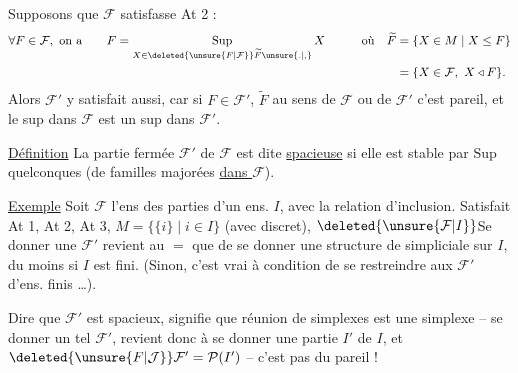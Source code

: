 Supposons que $\mathcal F$ satisfasse At 2 :
\[
\begin{aligned}
\forall F\in\mathcal F,\ \text{on a}\qquad
 F&=\mathop{\mathrm{Sup}}\limits_{X\in\deleted{\unsure{F|\mathcal F}}\widetilde F\unsure{.|,}}X
 &\qquad \text{où}\quad \widetilde F&=\{X\in M\mid X\leq F\}\\
 &&&=\{X\in\mathcal F,\ X\triangleleft F\}.
\end{aligned}
\]
Alors $\mathcal F'$ y satisfait aussi, car si $F\in\mathcal F'$, $\widetilde F$ au sens de $\mathcal F$ ou de $\mathcal F'$ c'est pareil, et le sup dans $\mathcal F$ est un sup dans $\mathcal F'$.

\uline{Définition} \quad La partie fermée $\mathcal F'$  de $\mathcal F$ est dite \uline{spacieuse} si elle est stable par $\mathrm{Sup}$ quelconques (de familles majorées \uline{dans $\mathcal F$}).

\uline{Exemple} \quad Soit $\mathcal F$  l'ens des parties d'un ens. $I$,  avec la relation d'inclusion. Satisfait At 1, At 2, At 3,  $M=\{\{i\}\mid i\in I\}$ (avec  discret), 
$\deleted{\unsure{\mathcal F|I}}$Se donner une $\mathcal F'$  revient au $=$ que de se donner une structure de   simpliciale sur  $I$, du moins si $I$ est fini. (Sinon, c'est vrai à condition de se restreindre aux $\mathcal F'$  d'ens. finis \ldots).

Dire que $\mathcal F'$ est spacieux, signifie que  réunion de simplexes est une simplexe -- se donner un tel $\mathcal F'$, revient donc à se donner une partie $I'$ de $I$,  et $\deleted{\unsure{F|\mathcal J}}\mathcal F'=\mathcal P(I')$ -- c'est pas du  pareil !
